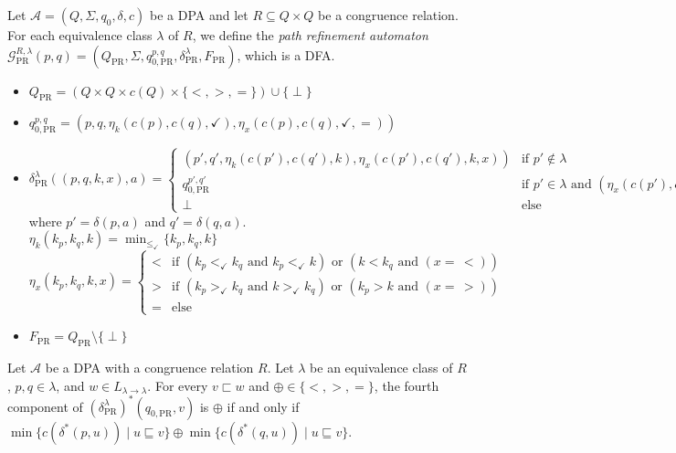 \begin{defn}
	Let $\mathcal{A} = (Q, \Sigma, q_0, \delta, c)$ be a DPA and let $R \subseteq Q \times Q$ be a congruence relation. For each equivalence class $\lambda$ of $R$, we define the \emph{path refinement automaton} $\mathcal{G}_\text{PR}^{R,\lambda}(p, q) = (Q_\text{PR}, \Sigma, q_{0, \text{PR}}^{p,q}, \delta^\lambda_\text{PR}, F_\text{PR})$, which is a DFA.
	
	\begin{itemize}
		\item $Q_\text{PR} = (Q \times Q \times c(Q) \times \{<, >, =\}) \cup \{ \perp \}$
		\item $q_{0, \text{PR}}^{p,q} = (p, q, \eta_k(c(p), c(q), \checkmark), \eta_x(c(p), c(q), \checkmark, =))$
		\item $\delta^\lambda_\text{PR}((p, q, k, x), a) = \begin{cases}
			(p', q', \eta_k(c(p'), c(q'), k), \eta_x(c(p'), c(q'), k, x)) & \text{if } p' \notin \lambda \\
			q_{0,\text{PR}}^{p',q'} & \text{if } p' \in \lambda \text{ and } (\eta_x(c(p'), c(q'), k, x) =\, =) \\
			\perp & \text{else}
		\end{cases}$ \\
			where $p' = \delta(p, a)$ and $q' = \delta(q, a)$. \\
			$\eta_k(k_p, k_q, k) = \min_{\leq_\checkmark} \{k_p, k_q, k\}$ \\
			$\eta_x(k_p, k_q, k, x) = \begin{cases}
				< & \text{if } (k_p <_\checkmark k_q \text{ and } k_p <_\checkmark k) \text{ or } (k < k_q \text{ and } (x =\, <)) \\
				> & \text{if } (k_p >_\checkmark k_q \text{ and } k >_\checkmark k_q) \text{ or } (k_p > k \text{ and } (x =\, >)) \\
				= & \text{else}
			\end{cases}$ 
		\item $F_\text{PR} = Q_\text{PR} \setminus \{\perp\}$
	\end{itemize}
\end{defn}

\begin{lem}
	Let $\mathcal{A}$ be a DPA with a congruence relation $R$. Let $\lambda$ be an equivalence class of $R$, $p, q \in \lambda$, and $w \in L_{\lambda \rightarrow \lambda}$. For every $v \sqsubset w$ and $\oplus \in \{<, >, =\}$, the fourth component of $(\delta_\text{PR}^\lambda)^*(q_{0,\text{PR}}, v)$ is $\oplus$ if and only if $\min \{ c(\delta^*(p, u)) \mid u \sqsubseteq v \} \oplus \min \{ c(\delta^*(q, u)) \mid u \sqsubseteq v \}$.
	\label{lem:pr:pr_game_nx}
\end{lem}

